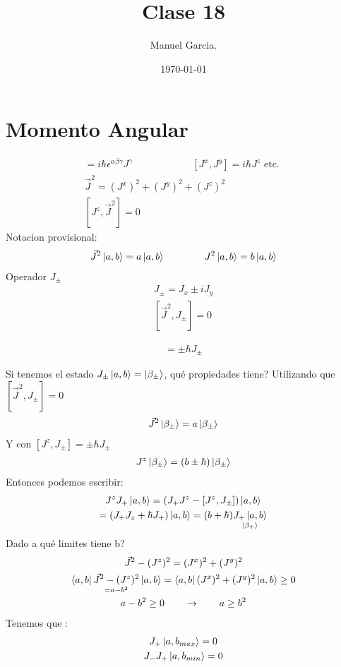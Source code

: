 \documentclass{article}
\title{Clase 18 }
\author{Manuel Garcia.}
\date{\today}
\newcommand{\caja}[3]{%
  \begin{tcolorbox}[colback=#1!5!white,colframe=#1!25!black,title=#2]
    #3
  \end{tcolorbox}%
}
\begin{document}
\maketitle

\section{Momento Angular}
\begin{gather*}
  [J ^ {\alpha}, J ^ {\beta}] = i \hbar  \epsilon ^ {\alpha\beta\gamma} J ^ {\gamma} \qquad \qquad \qquad [J ^ {x }, J ^ {y }] = i \hbar J ^ {z } \text{ etc. }\\
  \vec J ^2 = (J ^ {x })^2 + (J^y)^2 + (J^z )^2 \\
  [J^z, \vec J^2] = 0 
\end{gather*}
Notacion provisional: 
\begin{gather*}
  \vec J ^2 \ket{a,b } = a \ket{a,b }\qquad \qquad J^2 \ket{a, b } = b \ket{a,b } 
\end{gather*}
Operador $ J _{\pm }  $
\begin{gather*}
  J _{\pm } = J _x \pm i J _y  \\
  [\vec J^2, J _{\pm } ] = 0
\end{gather*}
\caja{red}{}{
  \begin{gather*}
    [J^z, J _{\pm } ] = \pm \hbar J _{\pm }
  \end{gather*}
}

Si tenemos el estado $ J _{\pm } \ket{a,b } = \ket{\beta _{\pm } } $, qué propiedades tiene? Utilizando que $[\vec J^2, J _{\pm } ] = 0$
\begin{gather*}
  \vec J^2 \ket{\beta _{\pm } } = a \ket{\beta _{\pm} } 
\end{gather*}
Y con $ [J^z, J _{\pm } ] = \pm \hbar J _{\pm } $
\begin{gather*}
  J^z \ket{\beta _{\pm } } = (b\pm \hbar ) \ket{\beta _{\pm } } 
\end{gather*}
Entonces podemos escribir: 
\begin{gather*}
  J ^ {z } J _{+ } \ket{a, b } = ( J_+ J ^z - [J ^ {z }, J _{\pm } ]) \ket{a, b }\\
  = (J_+ J_z + \hbar J _{+ } ) \ket{a, b } = (b + \hbar )  \underset{\ket{\beta_+ }}{J _{+ }\ket{a, b }}
\end{gather*}
Dado a qué limites tiene b? 
\begin{gather*}
  \vec J^2 - (J^z)^2 = (J^x)^2 + (J^y)^2 \\
  \underset{= a- b^2 }{\bra{a, b } \vec J^2 - (J^z)^2 \ket{a,b }} = \bra{a, b } (J^x)^2 + (J^y)^2 \ket{a,b } \geq 0 \\
  a - b^2 \geq 0 \qquad \rightarrow \qquad a \geq b^2 
\end{gather*}
Tenemos que : 
\begin{gather*}
  J _{+ } \ket{a, b _{max }  } = 0  \\
  J _{-  } J _{+ }  \ket{a, b _{min } } = 0 
\end{gather*}
\end{document}
